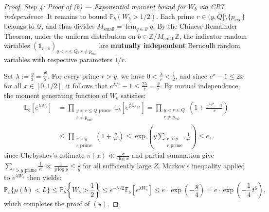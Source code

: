 \documentclass[11pt, a4paper]{article}
\theoremstyle{plain}
\theoremstyle{definition}
\newcommand{\Z}{\mathbb{Z}}
\newcommand{\Pbb}{\mathbb{P}}
\newcommand{\Ebb}{\mathbb{E}}
\newcommand{\ind}{\mathbf{1}}
\begin{document}
\begin{proof}
\medskip\noindent
\emph{Step 4: Proof of (b) --- Exponential moment bound for $W_b$ via CRT independence.} It remains to bound $\Pbb_b(W_b > 1/2)$. Each prime $r \in (y, Q] \setminus \{p_{\mathrm{exc}}\}$ belongs to $\mathcal{Q}$, and thus divides $M_{\mathrm{small}} = \operatorname{lcm}_{q \in \mathcal{Q}} q$. By the Chinese Remainder Theorem, under the uniform distribution on $b \in \Z / M_{\mathrm{small}} \Z$, the indicator random variables $(\ind_{r \mid b})_{y < r \le Q,\, r \ne p_{\mathrm{exc}}}$ are \textbf{mutually independent} Bernoulli random variables with respective parameters $1/r$.

Set $\lambda := \frac{y}{2} = \frac{t^6}{2}$. For every prime $r > y$, we have $0 < \frac{\lambda}{r} < \frac{1}{2}$, and since $e^x - 1 \le 2x$ for all $x \in [0, 1/2]$, it follows that $e^{\lambda / r} - 1 \le \frac{2\lambda}{r} = \frac{y}{r}$. By mutual independence, the moment generating function of $W_b$ satisfies:
\[
\begin{aligned}
\Ebb_b\!\left[ e^{\lambda W_b} \right] &= \prod_{\substack{y < r \le Q \text{ prime} \\ r \ne p_{\mathrm{exc}}}} \Ebb_b\!\left[ e^{\frac{\lambda}{r}\ind_{r \mid b}} \right] = \prod_{\substack{y < r \le Q \\ r \ne p_{\mathrm{exc}}}} \left( 1 + \frac{e^{\lambda/r} - 1}{r} \right) \\
&\le \prod_{\substack{r > y \\ r \text{ prime}}} \left( 1 + \frac{y}{r^2} \right) \le \exp\!\left( y \sum_{\substack{r > y \\ r \text{ prime}}} \frac{1}{r^2} \right) \le e,
\end{aligned}
\]
since Chebyshev's estimate $\pi(x) \ll \frac{x}{\log x}$ and partial summation give $\sum_{r > y\text{ prime}} \frac{1}{r^2} \ll \frac{1}{y \log y} \le \frac{1}{y}$ for all sufficiently large $Z$. Markov's inequality applied to $e^{\lambda W_b}$ then yields:
\[
\Pbb_b\big\{ \mu(b) < L \big\} \le \Pbb_b\!\left\{ W_b > \frac{1}{2} \right\} \le e^{-\lambda / 2} \Ebb_b\!\left[ e^{\lambda W_b} \right] \le e \cdot \exp\!\left(-\frac{y}{4}\right) = e \cdot \exp\!\left(-\frac{1}{4}\,t^6\right),
\]
which completes the proof of $(\star)$.
\end{proof}
\end{document}

